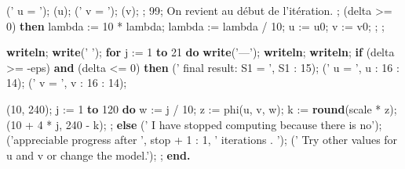 {{{      ('                        u = '); 
      (u); 
      ('                        v = '); 
      (v); 
      ; 
      99; \hfill %
{\eightpoint On revient au d\'ebut de l'it\'eration.  } 
      ; 
\smallskip 
   \filbreak 
\vskip-12pt 
   (delta >= 0) {\bf then} 
\smallskip 
      \iB lambda := 10 * lambda; 
\smallskip 
   \filbreak 
\smallskip 
      \iB lambda := lambda / 10; 
      \iB u := u0; 
      \iB v := v0; 
      ; 
\smallskip 
   ; 
 
\medskip 
\filbreak 
 \vskip-12pt 
    {\bf writeln}; 
    {\bf write}('     '); 
    {\bf for} j := 1 {\bf to} 21 {\bf do} 
    {\bf write}('---'); 
    {\bf writeln}; 
    {\bf writeln}; 
\smallskip 
\filbreak 
    {\bf if} (delta >= -eps) {\bf and} (delta <= 0) {\bf then} 
\smallskip 
\vskip-12pt 
      ('    final result:          S1 = ', S1 : 15); 
      ('                            u =  ', u : 16 : 14); 
      ('                            v =  ', v : 16 : 14); 
 
\medskip 
\filbreak 
\vskip-12pt 
     (10, 240); 
 \smallskip 
      j := 1 {\bf to} 120 {\bf do} 
 \smallskip 
         \iB w := j / 10; 
         \iB z := phi(u, v, w); 
         \iB k := {\bf round}(scale * z); 
         (10 + 4 * j, 240 - k); 
         ; 
\smallskip 
\smallskip 
\filbreak 
\vskip-12pt 
    {\bf else} 
\smallskip 
       ('  I have stopped computing because there is no'); 
       ('appreciable progress after ', stop + 1 : 1, '  
iterations . '); 
       ('  Try other values for u and v or change the model.'); 
       ;
\smallskip
   {\bf end.}

\medskip
}
}%
}%


\bye 
